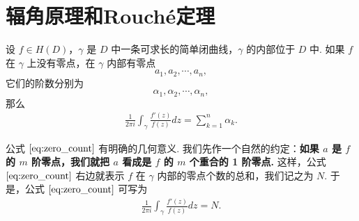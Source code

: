 \documentclass[../../main.tex]{subfiles}
\begin{document}
\section{辐角原理和Rouché定理}

\begin{theorem}\label{theorem:定理4.4.1}
设 \( f \in H(D) \)，\( \gamma \) 是 \( D \) 中一条可求长的简单闭曲线，\( \gamma \) 的内部位于 \( D \) 中. 如果 \( f \) 在 \( \gamma \) 上没有零点，在 \( \gamma \) 内部有零点
\[
a_1, a_2, \cdots, a_n,
\]
它们的阶数分别为
\[
\alpha_1, \alpha_2, \cdots, \alpha_n,
\]
那么
\begin{align}
\frac{1}{2\pi i} \int_{\gamma} \frac{f'(z)}{f(z)} dz = \sum_{k=1}^{n} \alpha_k. \label{eq:zero_count}
\end{align}
\end{theorem}
\begin{remark}
公式 \(\eqref{eq:zero_count}\) 有明确的几何意义. 我们先作一个自然的约定：\textbf{如果 \( a \) 是 \( f \) 的 \( m \) 阶零点，我们就把 \( a \) 看成是 \( f \) 的 \( m \) 个重合的 1 阶零点.} 这样，公式 \(\eqref{eq:zero_count}\) 右边就表示 \( f \) 在 \( \gamma \) 内部的零点个数的总和，我们记之为 \( N \). 于是，公式 \(\eqref{eq:zero_count}\) 可写为
\begin{align}
\frac{1}{2\pi i} \int_{\gamma} \frac{f'(z)}{f(z)} dz = N. \label{eq:zero_count_geo}
\end{align}
\end{remark}
\end{document}
